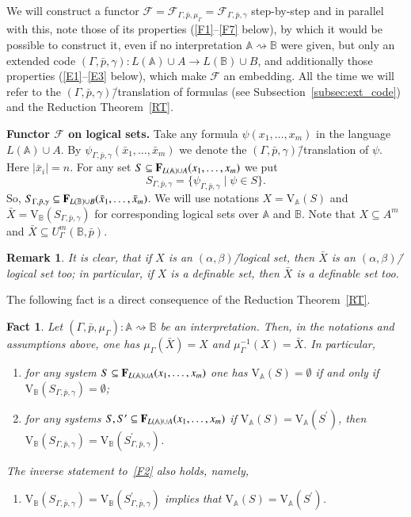 \documentclass[12pt]{article}
\newtheorem{fact}{Fact}
\newtheorem{remark}{Remark}
\theoremstyle{definition}
\def\MA{{\mathbb{A}}}
\def\MB{{\mathbb{B}}}
\def\F{{\mathcal{F}}}
\def\V{{\mathrm{V}}}
\begin{document}
We will construct a functor $\F=\F_{\Gamma,\bar p,\mu_\Gamma}=\F_{\Gamma,\bar p,\gamma}$ step-by-step and in parallel with this, note those of its properties (\ref{F1}--\ref{F7} below), by which it would be possible to construct it, even if no interpretation $\MA\rightsquigarrow\MB$ were given, but only an extended code $(\Gamma,\bar p,\gamma)\colon L(\MA)\cup A\to L(\MB)\cup B$, and additionally those properties (\ref{E1}--\ref{E3} below), which make $\F$ an embedding. All the time we will refer to the $(\Gamma,\bar p,\gamma)$\=/translation of formulas (see Subsection~\ref{subsec:ext_code}) and the Reduction Theorem~\ref{RT}.

{\bf Functor $\F$ on logical sets.}
Take any formula $\psi(x_1,\ldots,x_m)$ in the language $L(\MA)\cup A$. By $\psi_{\Gamma,\bar p,\gamma}(\bar x_1,\ldots,\bar x_m)$ we denote the $(\Gamma,\bar p,\gamma)$\=/translation of $\psi$. Here $|\bar x_i|=n$. For any set $S\subseteq {\bf F}_{L(\MA)\cup A}(x_1,\ldots,x_m)$ we put
$$
S_{\Gamma,\bar p,\gamma}=\{\psi_{\Gamma,\bar p,\gamma}\mid \psi\in S\}.
$$
So, $S_{\Gamma,\bar p,\gamma}\subseteq {\bf F}_{L(\MB)\cup B}(\bar x_1,\ldots,\bar x_m)$. We will use notations $X=\V_\MA(S)$ and $\bar X=\V_\MB(S_{\Gamma,\bar p,\gamma})$ for corresponding logical sets over $\MA$ and $\MB$. Note that $X\subseteq A^m$ and $\bar X\subseteq U_\Gamma^m(\MB,\bar p)$. 

\begin{remark}\label{remark:a,b}
It is clear, that if $X$ is an $(\alpha,\beta)$\=/logical set, then $\bar X$ is an $(\alpha,\beta)$\=/logical set too; in particular, if $X$ is a definable set, then $\bar X$ is a definable set too.   
\end{remark}

The following fact is a direct consequence of the Reduction Theorem~\ref{RT}.

\begin{fact}\label{fact1}
Let $(\Gamma,\bar p,\mu_\Gamma)\colon\MA\rightsquigarrow\MB$ be an interpretation. Then, in the notations and assumptions above, 
one has $\mu_\Gamma(\bar X)=X$ and $\mu_\Gamma^{-1}(X)=\bar X$.
In particular,
\begin{enumerate}[label=(F\arabic*)]
    \item\label{F1} for any system $S\subseteq {\bf F}_{L(\MA)\cup A}(x_1,\ldots,x_m)$ one has $\V_\MA(S)=\emptyset$ if and only if $\V_\MB(S_{\Gamma,\bar p,\gamma})=\emptyset$;
\item\label{F2} for any systems $S,S^\prime\subseteq {\bf F}_{L(\MA)\cup A}(x_1,\ldots,x_m)$ if $\V_\MA(S)=\V_\MA(S^\prime)$, then $\V_\MB(S_{\Gamma,\bar p,\gamma})=\V_\MB(S^\prime_{\Gamma,\bar p,\gamma})$.
\end{enumerate}
The inverse statement to~\ref{F2}  also holds, namely,
\begin{enumerate}[label=(E\arabic*)]
    \item\label{E1}   $\V_\MB(S_{\Gamma,\bar p,\gamma})=\V_\MB(S^\prime_{\Gamma,\bar p,\gamma})$ implies that $\V_\MA(S)=\V_\MA(S^\prime)$.
\end{enumerate}
\end{fact}
\end{document}
